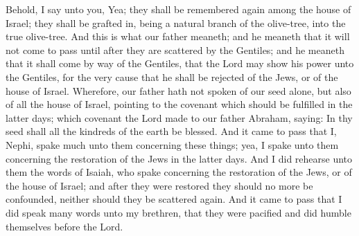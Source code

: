 Behold, I say unto you, Yea; they shall be remembered again among the house of Israel; they shall be grafted in, being a natural branch of the olive-tree, into the true olive-tree.
\bverse \iffalse And this is what our father meaneth; and he meaneth that it will not come to pass until after they are scattered by the Gentiles; and he meaneth that it shall come by way of the Gentiles, that the Lord may show his power unto the Gentiles, for the very cause that he shall be rejected of the Jews, or of the house of Israel. \fi
And this is what our father meaneth; and he meaneth that it will not come to pass until after they are scattered by the Gentiles; and he meaneth that it shall come by way of the Gentiles, that the Lord may show his power unto the Gentiles, for the very cause that he shall be rejected of the Jews, or of the house of Israel.
\bverse \iffalse Wherefore, our father hath not spoken of our seed alone, but also of all the house of Israel, pointing to the covenant which should be fulfilled in the latter days; which covenant the Lord made to our father Abraham, saying: In thy seed shall all the kindreds of the earth be blessed. \fi
Wherefore, our father hath not spoken of our seed alone, but also of all the house of Israel, pointing to the covenant which should be fulfilled in the latter days; which covenant the Lord made to our father Abraham, saying: In thy seed shall all the kindreds of the earth be blessed.
\bverse \iffalse And it came to pass that I, Nephi, spake much unto them concerning these things; yea, I spake unto them concerning the restoration of the Jews in the latter days. \fi
And it came to pass that I, Nephi, spake much unto them concerning these things; yea, I spake unto them concerning the restoration of the Jews in the latter days.
\bverse \iffalse And I did rehearse unto them the words of Isaiah, who spake concerning the restoration of the Jews, or of the house of Israel; and after they were restored they should no more be confounded, neither should they be scattered again. And it came to pass that I did speak many words unto my brethren, that they were pacified and did humble themselves before the Lord. \fi
And I did rehearse unto them the words of Isaiah, who spake concerning the restoration of the Jews, or of the house of Israel; and after they were restored they should no more be confounded, neither should they be scattered again. And it came to pass that I did speak many words unto my brethren, that they were pacified and did humble themselves before the Lord.
